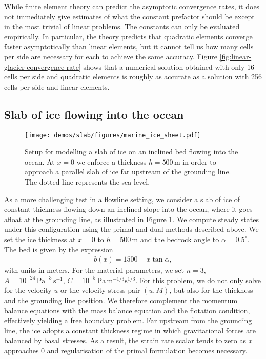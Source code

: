 \documentclass{article}
\theoremstyle{definition}
\theoremstyle{plain}
\begin{document}
While finite element theory can predict the asymptotic convergence rates, it does not immediately give estimates of what the constant prefactor should be except in the most trivial of linear problems.
The constants can only be evaluated empirically.
In particular, the theory predicts that quadratic elements converge faster asymptotically than linear elements, but it cannot tell us how many cells per side are necessary for each to achieve the same accuracy.
Figure \ref{fig:linear-glacier-convergence-rate} shows that a numerical solution obtained with only 16 cells per side and quadratic elements is roughly as accurate as a solution with 256 cells per side and linear elements.

\subsection{Slab of ice flowing into the ocean}

\begin{figure}[t]
\centering
	\texttt{[image: demos/slab/figures/marine\_ice\_sheet.pdf]}
	\caption{Setup for modelling a slab of ice on an inclined bed flowing into the ocean. At $x = 0$ we enforce a thickness $h = 500\,\mathrm{m}$ in order to approach a parallel slab of ice far upstream of the grounding line. The dotted line represents the sea level.}
	\label{fig:domain_parallel_slab}
\end{figure}

As a more challenging test in a flowline setting, we consider a slab of ice of constant thickness flowing down an inclined slope into the ocean, where it goes afloat at the grounding line, as illustrated in Figure \ref{fig:domain_parallel_slab}. We compute steady states under this configuration using the primal and dual methods described above. We set the ice thickness at $x = 0$ to $h = 500\, \mathrm{m}$ and the bedrock angle to $\alpha = 0.5^\circ$. The bed is given by the expression
%
\begin{align}
	b(x) = 1500 - x\tan{\alpha},
\end{align}
%
with units in meters. For the material parameters, we set $n = 3$, $A = 10^{-24}\,\mathrm{Pa}^{-3}\,\mathrm{s}^{-1}$, $C = 10^{-5}\,\mathrm{Pa}\,\mathrm{m}^{-1/3}\mathrm{s}^{1/3}$. For this problem, we do not only solve for the velocity $u$ or the velocity-stress pair $(u,M)$, but also for the thickness and the grounding line position. We therefore complement the momentum balance equations with the mass balance equation and the flotation condition, effectively yielding a free boundary problem. Far upstream from the grounding line, the ice adopts a constant thickness regime in which gravitational forces are balanced by basal stresses. As a result, the strain rate scalar tends to zero as $x$ approaches 0 and regularisation of the primal formulation becomes necessary.
\end{document}
